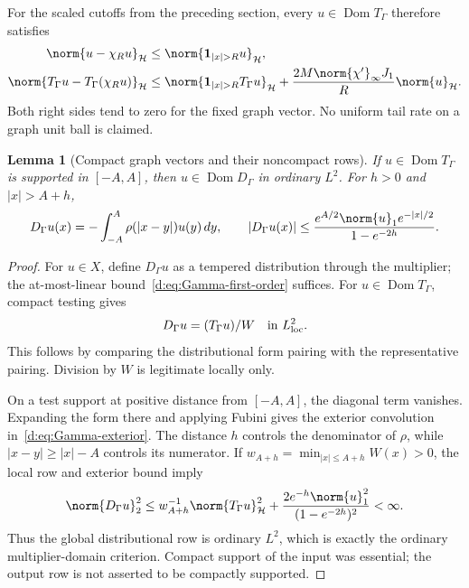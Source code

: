\documentclass[11pt,a4paper]{article}
\numberwithin{equation}{section}
\newtheorem{lemma}[theorem]{Lemma}
\theoremstyle{definition}\newtheorem{definition}[theorem]{Definition}
\theoremstyle{remark}\newtheorem{remark}[theorem]{Remark}
\newcommand{\Hh}{\mathcal H}\newcommand{\Hw}{\mathcal H}
\begin{document}
For the scaled cutoffs from the preceding section, every $u\in\operatorname{Dom}T_\Gamma$ therefore satisfies
\begin{align}
 \norm{u-\chi_Ru}_{\Hh}&\le\norm{\boldsymbol1_{|x|>R}u}_{\Hh},\notag\\
 \norm{T_\Gamma u-T_\Gamma(\chi_Ru)}_{\Hh}
 &\le\norm{\boldsymbol1_{|x|>R}T_\Gamma u}_{\Hh}
       +\frac{2M\norm{\chi'}_\infty J_1}{R}\norm{u}_{\Hh}.
 \label{d:eq:Gamma-cutoff-graph}
\end{align}
Both right sides tend to zero for the fixed graph vector. No uniform tail rate on a graph unit ball is claimed.

\begin{lemma}[Compact graph vectors and their noncompact rows]\label{d:lem:Gamma-compact-row}
If $u\in\operatorname{Dom}T_\Gamma$ is supported in $[-A,A]$, then $u\in\operatorname{Dom}D_\Gamma$ in ordinary $L^2$. For $h>0$ and $|x|>A+h$,
\begin{equation}\label{d:eq:Gamma-exterior}
 D_\Gamma u(x)=-\int_{-A}^A\rho(|x-y|)u(y)\,dy,
 \qquad
 |D_\Gamma u(x)|\le
 \frac{e^{A/2}\norm{u}_1e^{-|x|/2}}{1-e^{-2h}}.
\end{equation}
\end{lemma}
\begin{proof}
For $u\in{X}$, define $D_\Gamma u$ as a tempered distribution through the multiplier; the at-most-linear bound~\eqref{d:eq:Gamma-first-order} suffices. For $u\in\operatorname{Dom}T_\Gamma$, compact testing gives
\begin{equation}\label{d:eq:Gamma-local-row}
 D_\Gamma u=(T_\Gamma u)/W\quad\hbox{in }L^2_{\rm loc}.
\end{equation}
This follows by comparing the distributional form pairing with the representative pairing. Division by $W$ is legitimate locally only.

On a test support at positive distance from $[-A,A]$, the diagonal term vanishes. Expanding the form there and applying Fubini gives the exterior convolution in~\eqref{d:eq:Gamma-exterior}. The distance $h$ controls the denominator of $\rho$, while $|x-y|\ge|x|-A$ controls its numerator. If
$w_{A+h}=\min_{|x|\le A+h}W(x)>0$, the local row and exterior bound imply
\[
 \norm{D_\Gamma u}_2^2
 \le w_{A+h}^{-1}\norm{T_\Gamma u}_{\Hh}^2
       +\frac{2e^{-h}\norm{u}_1^2}{(1-e^{-2h})^2}<\infty.
\]
Thus the global distributional row is ordinary $L^2$, which is exactly the ordinary multiplier-domain criterion. Compact support of the input was essential; the output row is not asserted to be compactly supported.
\end{proof}
\end{document}
